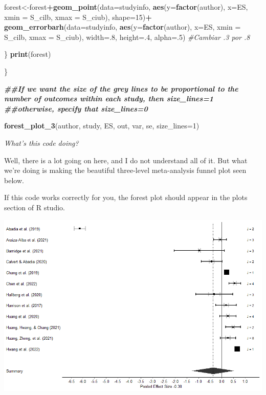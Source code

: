 \documentclass[
]{book}
\newenvironment{Shaded}{\begin{snugshade}}{\end{snugshade}}
\newcommand{\AttributeTok}[1]{\textcolor[rgb]{0.13,0.29,0.53}{#1}}
\newcommand{\CommentTok}[1]{\textcolor[rgb]{0.56,0.35,0.01}{\textit{#1}}}
\newcommand{\DecValTok}[1]{\textcolor[rgb]{0.00,0.00,0.81}{#1}}
\newcommand{\DocumentationTok}[1]{\textcolor[rgb]{0.56,0.35,0.01}{\textbf{\textit{#1}}}}
\newcommand{\FunctionTok}[1]{\textcolor[rgb]{0.13,0.29,0.53}{\textbf{#1}}}
\newcommand{\NormalTok}[1]{#1}
\newcommand{\OtherTok}[1]{\textcolor[rgb]{0.56,0.35,0.01}{#1}}
\newcommand{\SpecialCharTok}[1]{\textcolor[rgb]{0.81,0.36,0.00}{\textbf{#1}}}
\begin{document}
\begin{Shaded}
\begin{Highlighting}[]
\NormalTok{    forest}\OtherTok{\textless{}{-}}\NormalTok{forest}\SpecialCharTok{+}\FunctionTok{geom\_point}\NormalTok{(}\AttributeTok{data=}\NormalTok{studyinfo, }\FunctionTok{aes}\NormalTok{(}\AttributeTok{y=}\FunctionTok{factor}\NormalTok{(author), }\AttributeTok{x=}\NormalTok{ES, }\AttributeTok{xmin =}\NormalTok{ S\_cilb, }\AttributeTok{xmax =}\NormalTok{  S\_ciub), }\AttributeTok{shape=}\DecValTok{15}\NormalTok{)}\SpecialCharTok{+}
      \FunctionTok{geom\_errorbarh}\NormalTok{(}\AttributeTok{data=}\NormalTok{studyinfo, }\FunctionTok{aes}\NormalTok{(}\AttributeTok{y=}\FunctionTok{factor}\NormalTok{(author), }\AttributeTok{x=}\NormalTok{ES, }\AttributeTok{xmin =}\NormalTok{ S\_cilb, }\AttributeTok{xmax =}\NormalTok{  S\_ciub), }\AttributeTok{width=}\NormalTok{.}\DecValTok{8}\NormalTok{,  }\AttributeTok{height=}\NormalTok{.}\DecValTok{4}\NormalTok{, }\AttributeTok{alpha=}\NormalTok{.}\DecValTok{5}\NormalTok{) }\CommentTok{\#Cambiar .3 por .8}
    
\NormalTok{  \}}
  \FunctionTok{print}\NormalTok{(forest)}

\NormalTok{\}}


\DocumentationTok{\#\#If we want the size of the grey lines to be proportional to the number of outcomes within each study, then size\_lines=1}
\DocumentationTok{\#\#otherwise, specify that size\_lines=0}

\FunctionTok{forest\_plot\_3}\NormalTok{(author, study, ES, out, var, se, }\AttributeTok{size\_lines=}\DecValTok{1}\NormalTok{)}
\end{Highlighting}
\end{Shaded}

\emph{What's this code doing?}

Well, there is a lot going on here, and I do not understand all of it. But what we're doing is making the beautiful three-level meta-analysis funnel plot seen below.

If this code works correctly for you, the forest plot should appear in the plots section of R studio.

\includegraphics[width=1\textwidth,height=\textheight]{images/3lmaforest.png}
\end{document}
